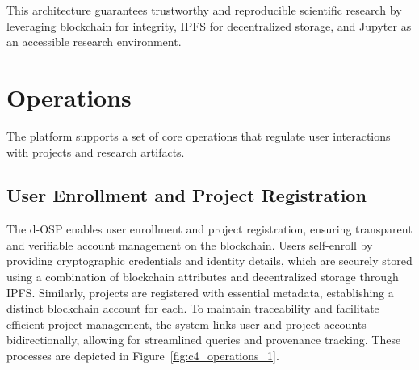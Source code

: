 \documentclass[final]{rc-book-2.14}
\begin{document}
This architecture guarantees trustworthy and reproducible scientific research by leveraging blockchain for integrity, IPFS for decentralized storage, and Jupyter as an accessible research environment.


\section{Operations}
\label{chp:proposed_model:sec:operations}

The platform supports a set of core operations that regulate user interactions with projects and research artifacts.

\subsection{User Enrollment and Project Registration}

\sloppy
The d-OSP enables user enrollment and project registration, ensuring transparent and verifiable account management on the blockchain. Users self-enroll by providing cryptographic credentials and identity details, which are securely stored using a combination of blockchain attributes and decentralized storage through IPFS. Similarly, projects are registered with essential metadata, establishing a distinct blockchain account for each. To maintain traceability and facilitate efficient project management, the system links user and project accounts bidirectionally, allowing for streamlined queries and provenance tracking. These processes are depicted in Figure~\ref{fig:c4_operations_1}.
\fussy
\end{document}
